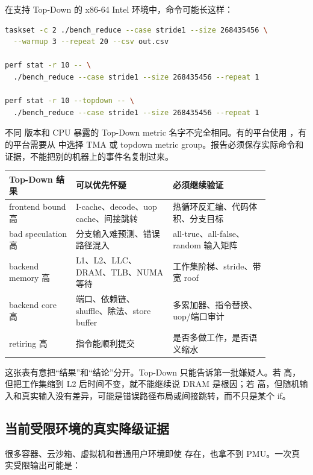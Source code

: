 在支持 Top-Down 的 x86-64 Intel 环境中，命令可能长这样：

\begin{lstlisting}[language=bash,caption={Top-Down 成功采集的命令形态}]
taskset -c 2 ./bench_reduce --case stride1 --size 268435456 \
  --warmup 3 --repeat 20 --csv out.csv

perf stat -r 10 -- \
  ./bench_reduce --case stride1 --size 268435456 --repeat 1

perf stat -r 10 --topdown -- \
  ./bench_reduce --case stride1 --size 268435456 --repeat 1
\end{lstlisting}

不同 \cmd{perf} 版本和 CPU 暴露的 Top-Down metric 名字不完全相同。有的平台使用 ，有的平台需要从  中选择 TMA 或 topdown metric group。报告必须保存实际命令和  证据，不能把别的机器上的事件名复制过来。

\begin{center}
\small
\begin{tabular}{p{0.22\linewidth}p{0.32\linewidth}p{0.32\linewidth}}
\toprule
Top-Down 结果 & 可以优先怀疑 & 必须继续验证 \\
\midrule
frontend bound 高 & I-cache、decode、uop cache、间接跳转 & 热循环反汇编、代码体积、分支目标 \\
bad speculation 高 & 分支输入难预测、错误路径混入 & all-true、all-false、random 输入矩阵 \\
backend memory 高 & L1、L2、LLC、DRAM、TLB、NUMA 等待 & 工作集阶梯、stride、带宽 roof \\
backend core 高 & 端口、依赖链、shuffle、除法、store buffer & 多累加器、指令替换、uop/端口审计 \\
retiring 高 & 指令能顺利提交 & 是否多做工作，是否语义缩水 \\
\bottomrule
\end{tabular}
\end{center}

这张表有意把“结果”和“结论”分开。Top-Down 只能告诉第一批嫌疑人。若  高，但把工作集缩到 L2 后时间不变，就不能继续说 DRAM 是根因；若  高，但随机输入和真实输入没有差异，可能是错误路径布局或间接跳转，而不只是某个 if。

\subsection{当前受限环境的真实降级证据}

很多容器、云沙箱、虚拟机和普通用户环境即使  存在，也拿不到 PMU。一次真实受限输出可能是：

